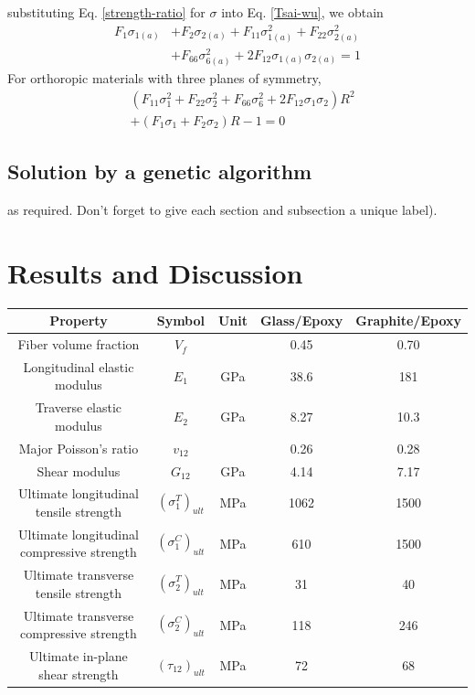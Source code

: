 \documentclass[smallextended]{svjour3}       %
\begin{document}
substituting Eq.  \ref{strength-ratio} for $\sigma$ into Eq. \ref{Tsai-wu}, we obtain
\begin{equation*}
	\begin{split}
		F_1\sigma_{1(a)}&+F_2\sigma_{2(a)}+F_{11}\sigma_{1(a)}^2+F_{22}\sigma_{2(a)}^2 \\
						&+F_{66}\sigma_{6(a)}^2+2F_{12}\sigma_{1(a)}\sigma_{2(a)}=1
    \end{split}
\end{equation*}
For orthoropic materials with three planes of symmetry, 
\begin{equation*}\label{Tsai-wu}
	\begin{split}
		&(F_{11}\sigma_1^2+F_{22}\sigma_2^2+F_{66}\sigma_6^2+2F_{12}\sigma_1\sigma_2)R^2 \\
		&+(F_1\sigma_1+F_2\sigma_2)R-1=0 
    \end{split}
\end{equation*}



\subsection{Solution by a genetic algorithm}\label{sec:2}
as required. Don't forget to give each section
and subsection a unique label).




\section{Results and Discussion}

\begin{tabular}{ccccc}
	\toprule
	Property								  & Symbol	   & Unit &  Glass/Epoxy &  Graphite/Epoxy  \\
	\midrule
	Fiber volume fraction					  & $V_f$		      &      &  0.45        &  0.70   \\
	Longitudinal elastic modulus			  & $E_1$		      & GPa  &  38.6        &  181  \\
	Traverse elastic modulus				  & $E_2$		      & GPa  &  8.27        &  10.3  \\
	Major Poisson's ratio					  & $v_{12}$	      &      &  0.26        &  0.28  \\
	Shear modulus							  & $G_{12}$	      & GPa  &  4.14        &  7.17  \\
	Ultimate longitudinal tensile strength    &  $(\sigma_1^T)_{ult}$ & MPa  &  1062        &  1500  \\
	Ultimate longitudinal compressive strength & $(\sigma_1^C)_{ult}$ & MPa  &  610        &  1500  \\
	Ultimate transverse tensile strength    &  $(\sigma_2^T)_{ult}$ & MPa  &  31        &  40 \\
	Ultimate transverse compressive strength & $(\sigma_2^C)_{ult}$ & MPa  &  118        &  246\\
	Ultimate in-plane shear strength          & $(\tau_{12})_{ult}$ & MPa  &  72&  68\\
	\bottomrule
\end{tabular}
\end{document}
